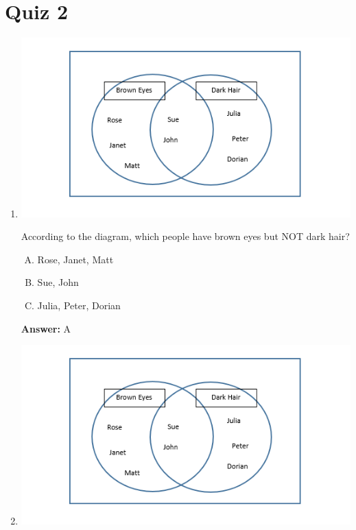 \documentclass[12pt]{article}
\begin{document}
\begin{itemize}
\begin{itemize}
    \end{itemize}
\end{itemize}

\bigskip

\section{Quiz 2}

\bigskip

\begin{enumerate}[1.]
    \item

    \begin{center}
    \includegraphics[width=0.8\linewidth]{images/part_1_notes_5.png}
    \end{center}

    \bigskip

    According to the diagram, which people have brown eyes but NOT dark hair?

    \bigskip

    \begin{enumerate}[A.]
        \item Rose, Janet, Matt
        \item Sue, John
        \item Julia, Peter, Dorian
    \end{enumerate}

    \bigskip

    \textbf{Answer:} A

    \item

    \begin{center}
    \includegraphics[width=0.8\linewidth]{images/part_1_notes_5.png}
    \end{center}


\end{enumerate}
\end{document}
